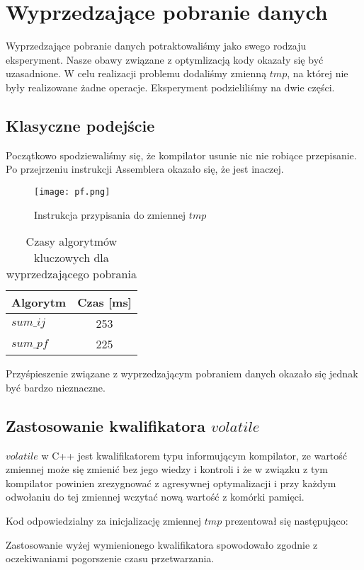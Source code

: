 \section{Wyprzedzające pobranie danych}

Wyprzedzające pobranie danych potraktowaliśmy jako swego rodzaju eksperyment. Nasze obawy związane z optymlizacją kody okazały się być uzasadnione. W celu realizacji problemu dodaliśmy zmienną $tmp$, na której nie były realizowane żadne operacje. Eksperyment podzieliliśmy na dwie części.

\subsection{Klasyczne podejście}

Początkowo spodziewaliśmy się, że kompilator usunie nic nie robiące przepisanie. Po przejrzeniu instrukcji Assemblera okazało się, że jest inaczej.

\begin{figure}[!ht]
\centering
\texttt{[image: pf.png]}
\caption{Instrukcja przypisania do zmiennej $tmp$}
\label{fig:symetry}
\end{figure}

\begin{table}[H]
\caption{Czasy algorytmów kluczowych dla wyprzedzającego pobrania}

\begin{tabular}{|l|c|}

\hline
  Algorytm &
  Czas [ms] \\

\hline
  $sum\_ij$ &
  253 \\

\hline
  $sum\_pf$ &
  225 \\

\hline

\end{tabular}

\end{table}

Przyśpieszenie związane z wyprzedzającym pobraniem danych okazało się jednak być bardzo nieznaczne.

\subsection{Zastosowanie kwalifikatora $volatile$}

$volatile$ w C++ jest kwalifikatorem typu informującym kompilator, ze wartość zmiennej może się zmienić bez jego wiedzy i kontroli i że w związku z tym kompilator powinien zrezygnować z agresywnej optymalizacji i przy każdym odwołaniu do tej zmiennej wczytać nową wartość z komórki pamięci.\newline

Kod odpowiedzialny za inicjalizację zmiennej $tmp$ prezentował się następująco:



Zastosowanie wyżej wymienionego kwalifikatora spowodowało zgodnie z oczekiwaniami pogorszenie czasu przetwarzania.



